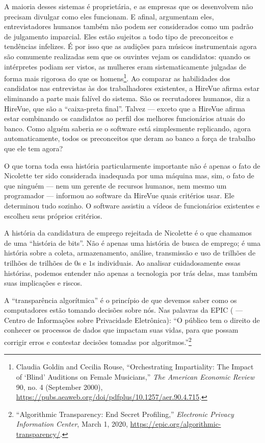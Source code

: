 A maioria desses sistemas é proprietária, e as empresas que os desenvolvem não 
precisam divulgar como eles funcionam. E afinal, argumentam eles,
entrevistadores humanos também não podem ser considerados como um padrão de
julgamento imparcial. Eles estão sujeitos a todo tipo de preconceitos e
tendências infelizes. É por isso que as audições para músicos instrumentais
agora são comumente realizadas sem que os ouvintes vejam os candidatos: quando
os intérpretes podiam ser vistos, as mulheres eram sistematicamente julgadas de
forma mais rigorosa do que os homens\footnote{Claudia Goldin and Cecilia Rouse,
``Orchestrating Impartiality: The Impact of `Blind' Auditions on Female
Musicians,'' \textit{The American Economic Review} 90, no. 4 (September 2000),
\url{https://pubs.aeaweb.org/doi/pdfplus/10.1257/aer.90.4.715}.}. Ao comparar as
habilidades dos candidatos nas entrevistas às dos trabalhadores existentes, a
HireVue afirma estar eliminando a parte mais falível do sistema. São os
recrutadores humanos, diz a HireVue, que são a ``caixa-preta final''. Talvez ---
exceto que a HireVue afirma estar combinando os candidatos ao perfil dos
melhores funcionários atuais do banco. Como alguém saberia se o software está
simplesmente replicando, agora automaticamente, todos os preconceitos que deram
ao banco a força de trabalho que ele tem agora?

O que torna toda essa história particularmente importante não é apenas o fato de
Nicolette ter sido considerada inadequada por uma máquina mas, sim, o fato de
que ninguém --- nem um gerente de recursos humanos, nem mesmo um programador ---
informou ao software da HireVue quais critérios usar. Ele determinou tudo
sozinho. O software assistiu a vídeos de funcionários existentes e escolheu seus
próprios critérios.

A história da candidatura de emprego rejeitada de Nicolette é o que chamamos de 
uma ``história de bits''. Não é apenas uma história de busca de emprego; é uma
história sobre a coleta, armazenamento, análise, transmissão e uso de trilhões
de trilhões de trilhões de $0$s e $1$s individuais. Ao analisar cuidadosamente
essas histórias, podemos entender não apenas a tecnologia por trás delas, mas
também suas implicações e riscos.

\begin{tcolorbox}
A ``transparência algorítmica'' é o princípio de que devemos saber como os
computadores estão tomando decisões sobre nós. Nas palavras da EPIC
( --- Centro de Informações sobre
Privacidade Eletrônica): ``O público tem o direito de conhecer os processos de
dados que impactam suas vidas, para que possam corrigir erros e contestar
decisões tomadas por algoritmos.''\footnote{``Algorithmic Transparency: End
Secret Profiling,'' \textit{Electronic Privacy Information Center}, March 1,
2020, \url{https://epic.org/algorithmic-transparency/}.}
\end{tcolorbox}


